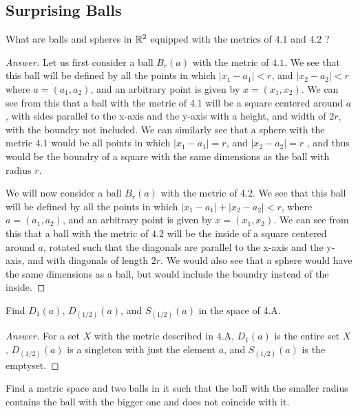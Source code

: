 \subsection{Surprising Balls}

\begin{minorEx}%
  What are balls and spheres in $\mathbb{R}^2$ equipped with the metrics
  of $4.1$ and $4.2$ ?
\end{minorEx}

\begin{proof}[Answer]
Let us first consider a ball $B_r(a)$ with the metric of $4.1$. We see that this
ball will be defined by all the points in which $|x_1-a_1|<r$,
and  $|x_2-a_2|<r$ where $a=(a_1,a_2)$, and an arbitrary point is given
by $x= (x_1,x_2)$. We can see from this that a ball with the metric of
$4.1$ will be a square centered around $a$, with sides parallel to
the x-axis and the y-axis with a height, and width
of $2r$, with the boundry not included. We can similarly see that a
sphere with the metric $4.1$ would be all points in which $|x_1-a_1|=r$,
and  $|x_2-a_2|=r$ , and thus would be the boundry of a square with
the same dimensions as the ball with radius $r$.

We will now consider a ball $B_r(a)$ with the metric of $4.2$. We see
that this ball will be defined by all the points in which 
$|x_1-a_1| + |x_2-a_2|<r$, where $a=(a_1,a_2)$, and
an arbitrary point is given by $x= (x_1,x_2)$. We can see from this
that a ball with the metric of $4.2$ will be the inside of a square centered around
$a$, rotated such that the diagonals are parallel to the x-axis and
the y-axis, and with diagonals of length $2r$. We would also see that
a sphere would have the same dimensions as a ball, but would include
the boundry instead of the inside.
\end{proof}

\begin{minorEx}%
Find $D_1(a)$, $D_(1/2)(a)$, and $S_(1/2)(a)$ in the space of 4.A.
\end{minorEx}
\begin{proof}[Answer]
For a set $X$ with the metric described in 4.A, $D_1(a)$ is the entire set $X$, $D_(1/2)(a)$ is a singleton with just the element $a$, and $S_(1/2)(a)$ is the emptyset.
\end{proof}

\begin{minorEx}%
    Find a metric space and two balls in it such that the ball with the smaller
    radius contains the ball with the bigger one and does not coincide with it.
\end{minorEx}

